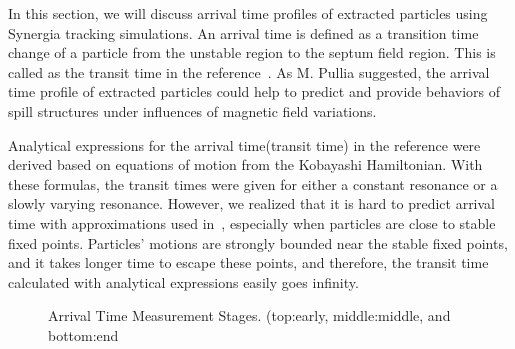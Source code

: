 \documentclass[aps,prstab,onecolumn,preprint,endfloats,11pt]{revtex4-1}
\begin{document}
In this section, we will discuss arrival time profiles of extracted particles using Synergia tracking simulations. An arrival time is defined as a transition time change of a particle from the unstable region to the septum field region. This is called as the transit time in the reference~\cite{pullia}. As M. Pullia suggested, the arrival time profile of extracted particles could help to predict and provide behaviors of spill structures under influences of magnetic field variations.

Analytical expressions for the arrival time(transit time) in the reference \cite{pullia} were derived based on equations of motion from the Kobayashi Hamiltonian. With these formulas, the transit times were given for either a constant resonance or a slowly varying resonance. However, we realized that it is hard to predict arrival time with approximations used in~\cite{pullia}, especially when particles are close to stable fixed points. Particles' motions are strongly bounded near the stable fixed points, and it takes longer time to escape these points, and therefore, the transit time calculated with analytical expressions easily goes infinity.

\begin{figure}[!tbp]
  \caption{\label{fig:arrival1}Arrival Time Measurement Stages. (top:early, middle:middle, and bottom:end}
\end{figure}
\end{document}

